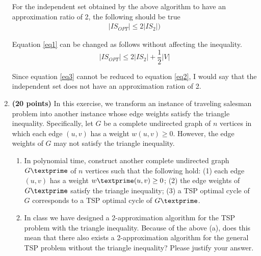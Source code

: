 \documentclass[paper=a4, fontsize=11pt]{scrartcl} %
\numberwithin{figure}{section} %
\numberwithin{table}{section} %
\begin{document}
\begin{enumerate}
For the independent set obtained by the above algorithm to have an approximation ratio of 2, the following should be true
\begin{align}
\label{eq2} 
\left | IS_{OPT} \right | \leq 2 \left | IS_2 \right |)
\end{align}

Equation \ref{eq1} can be changed as follows without affecting the inequality.
\begin{equation} 
\label{eq3}
\left | IS_{OPT} \right | \leq 2 \left | IS_2 \right | + \frac{1}{2} \left | V \right |
\end{equation}

Since equation \ref{eq3} cannot be reduced to equation \ref{eq2}, I would say that the independent set does not have an approximation ration of 2.

\item \textbf{(20 points)} In this exercise, we transform an instance of traveling salesman problem into another instance whose edge weights satisfy the triangle inequality.
Specifically, let $G$ be a complete undirected graph of $n$ vertices in which each edge $(u, v)$ has a weight $w(u, v) \geq 0$. However, the edge weights of $G$ may not satisfy the triangle inequality.

\begin{enumerate}
\item In polynomial time, construct another complete undirected graph $G\textprime$ of $n$ vertices such that the following hold: (1) each edge $(u,v)$ has a weight $w\textprime(u,v) \geq 0$; (2) the edge weights of $G\textprime$ satisfy the triangle inequality; (3) a TSP optimal cycle of $G$ corresponds to a TSP optimal cycle of $G\textprime$.

\item In class we have designed a 2-approximation algorithm for the TSP problem with the triangle inequality. Because of the above (a), does this mean that there also exists a 2-approximation algorithm for the general TSP problem without the triangle inequality? Please justify your answer.

\end{enumerate}




\end{enumerate}

\end{document}

